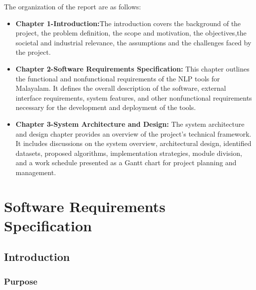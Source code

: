\documentclass[12pt,a4paper,titlepage]{report}
\begin{document}
	The organization of the report are as follows:
	\begin{itemize}
		\item 	\textbf{Chapter 1-Introduction:}The introduction covers the background of the project, the problem definition, the scope and motivation, the objectives,the societal and industrial relevance, the assumptions and the challenges faced by the project.
		
		\item \textbf{Chapter 2-Software Requirements Specification:} This chapter outlines the functional and nonfunctional requirements of the NLP tools for Malayalam. It defines the overall description of the software, external interface requirements, system features, and other nonfunctional requirements necessary for the development and deployment of the tools.
		
		\item \textbf{Chapter 3-System Architecture and Design:} The system architecture and design chapter provides an overview of the project’s technical framework. It includes discussions on the system overview, architectural design, identified datasets, proposed algorithms, implementation strategies, module division, and a work schedule presented as a Gantt chart for project planning and management.
	\end{itemize}
	
	
	
	
	
	
	
	\chapter{Software Requirements Specification}
	
	
	\section{Introduction}
	\subsection{Purpose}
\end{document}
